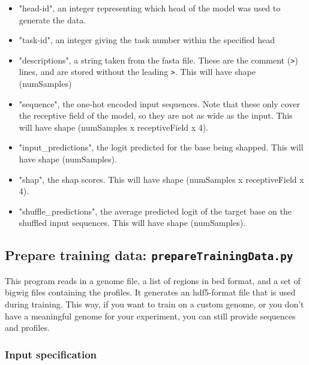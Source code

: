 \documentclass{article}
\begin{document}
\begin{itemize}
    \item "head-id", an integer representing which head of the model was used to generate the data.
    \item "task-id", an integer giving the task number within the specified head
    \item "descriptions", a string taken from the fasta file. These are the comment (\texttt{>}) lines, and are stored without the leading \texttt{>}. This will have shape (numSamples)
    \item "sequence", the one-hot encoded input sequences. Note that these only cover the receptive field of the model, so they are not as wide as the input. This will have shape (numSamples x receptiveField x 4).
    \item "input\_predictions", the logit predicted for the base being shapped. This will have shape (numSamples).
    \item "shap", the shap scores. This will have shape (numSamples x receptiveField x 4). 
    \item "shuffle\_predictions", the average predicted logit of the target base on the shuffled input sequences. This will have shape (numSamples). 
\end{itemize}




\newpage
\subsection{Prepare training data: \texttt{prepareTrainingData.py}}

This program reads in a genome file, a list of regions in bed format, and a set of bigwig files containing the profiles. 
It generates an hdf5-format file that is used during training. 
This way, if you want to train on a custom genome, or you don't have a meaningful genome for your experiment, you can still provide sequences and profiles. 

\subsubsection{Input specification}
\end{document}

